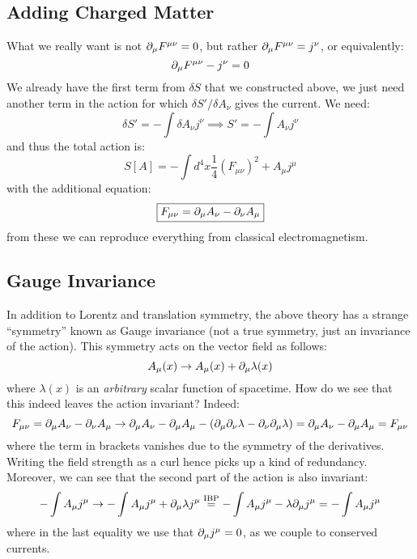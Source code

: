 \subsection{Adding Charged Matter}
What we really want is not $\partial_\mu F^{\mu\nu} = 0$, but rather $\partial_\mu F^{\mu\nu} = j^\nu$, or equivalently:
\begin{equation}
    \partial_\mu F^{\mu\nu} - j^\nu = 0
\end{equation}
We already have the first term from $\delta S$ that we constructed above, we just need another term in the action for which $\delta S'/\delta A_\nu$ gives the current. We need:
\begin{equation}
    \delta S' = -\int \delta A_\nu j^\nu \implies S' = -\int A_\nu j^\nu
\end{equation}
and thus the total action is:
\begin{equation}
    \boxed{S[A] = -\int d^4x \frac{1}{4}(F_{\mu\nu})^2 + A_\mu j^\mu}
\end{equation}
with the additional equation:
\begin{equation}
    \boxed{F_{\mu\nu} = \partial_\mu A_\nu - \partial_\nu A_\mu}
\end{equation}
from these we can reproduce everything from classical electromagnetism.

\subsection{Gauge Invariance}
In addition to Lorentz and translation symmetry, the above theory has a strange ``symmetry'' known as Gauge invariance (not a true symmetry, just an invariance of the action). This symmetry acts on the vector field as follows:
\begin{equation}
    A_\mu(x) \to A_\mu(x) + \partial_\mu \lambda(x)
\end{equation}
where $\lambda(x)$ is an \emph{arbitrary} scalar function of spacetime. How do we see that this indeed leaves the action invariant? Indeed:
\begin{equation}
    F_{\mu\nu} = \partial_\mu A_\nu - \partial_\nu A_\mu \to \partial_\mu A_\nu - \partial_\mu A_\mu - (\partial_\mu \partial_\nu \lambda - \partial_\nu \partial_\mu \lambda) = \partial_\mu A_\nu - \partial_\mu A_\mu = F_{\mu\nu}
\end{equation}
where the term in brackets vanishes due to the symmetry of the derivatives. Writing the field strength as a curl hence picks up a kind of redundancy. Moreover, we can see that the second part of the action is also invariant:
\begin{equation}
    -\int A_\mu j^\mu \to -\int A_\mu j^\mu + \partial_\mu \lambda j^\mu \stackrel{\text{IBP}}{=} -\int A_\mu j^\mu - \lambda \partial_\mu j^\mu = -\int A_\mu j^\mu
\end{equation}
where in the last equality we use that $\partial_\mu j^\mu = 0$, as we couple to conserved currents.


